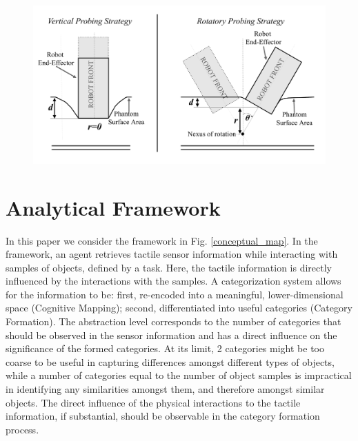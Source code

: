 \begin{figure}[]
	\centering
	\includegraphics[width=\columnwidth]{./figs/motion_diagram.pdf}
	\caption{\color{red}{Diagram of the two probing motions employed. The vertical probing motion is performed when $r=0$ and is described by the parameter $d$. The rotatory motion is performed with $r>0$, and is fully described by both the $d$ and $r$ parameters.}}
	\label{probing}
\end{figure}


\section{Analytical Framework} \label{sec_th_framework}
\color{red}
In this paper we consider the framework in Fig. \ref{conceptual_map}. In the framework, an agent retrieves tactile sensor information while interacting with samples of objects, defined by a task. Here, the tactile information is directly influenced by the interactions with the samples. A categorization system allows for the information to be: first, re-encoded into a meaningful, lower-dimensional space (Cognitive Mapping); second, differentiated into useful categories (Category Formation). The abstraction level corresponds to the number of categories that should be observed in the sensor information and has a direct influence on the significance of the formed categories. 
At its limit, 2 categories might be too coarse to be useful in capturing differences amongst different types of objects, while a number of categories equal to the number of object samples is impractical in identifying any similarities amongst them, and therefore amongst similar objects. The direct influence of the physical interactions to the tactile information, if substantial, should be observable in the category formation process. 

